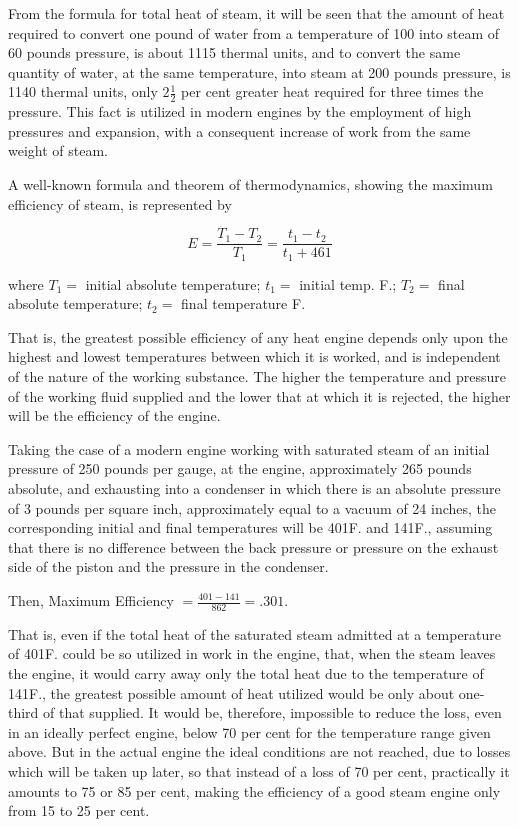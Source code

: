 \documentclass[11pt, a5paper]{book}
\begin{document}
From the formula for total heat of steam, it will be seen that the
amount of heat required to convert one pound of water from a
temperature of 100\degree{} into steam of 60 pounds pressure, is about
1115 thermal units, and to convert the same quantity of water, at the
same temperature, into steam at 200 pounds pressure, is 1140 thermal
units, only $2\frac{1}{2}$ per cent greater heat required for three
times the pressure.  This fact is utilized in modern engines by the
employment of high pressures and expansion, with a consequent increase
of work from the same weight of steam.\par

A well-known formula and theorem of thermodynamics, showing the
maximum efficiency of steam, is represented by\par

\begin{equation*}
  E = \frac{T_1 - T_2}{T_1} = \frac{t_1 - t_2}{t_1 + 461}
\end{equation*}

\noindent{} where $T_1 =$ initial absolute temperature; $t_1 =$
initial temp. F.; $T_2 =$ final absolute temperature; $t_2 =$ final
temperature F.\par

That is, the greatest possible efficiency of any heat engine depends
only upon the highest and lowest temperatures between which it is
worked, and is independent of the nature of the working substance.
The higher the temperature and pressure of the working fluid supplied
and the lower that at which it is rejected, the higher will be the
efficiency of the engine.\par

Taking the case of a modern engine working with saturated steam of an
initial pressure of 250 pounds per gauge, at the engine, approximately
265 pounds absolute, and exhausting into a condenser in which there is
an absolute pressure of 3 pounds per square inch, approximately equal
to a vacuum of 24 inches, the corresponding initial and final
temperatures will be 401\degree{}F. and 141\degree{}F., assuming that
there is no difference between the back pressure or pressure on the
exhaust side of the piston and the pressure in the condenser.\par

Then, Maximum Efficiency $=\frac{401 - 141}{862} = .301$.\par

That is, even if the total heat of the saturated steam admitted at a
temperature of 401\degree{}F. could be so utilized in work in the
engine, that, when the steam leaves the engine, it would carry away
only the total heat due to the temperature of 141\degree{}F., the
greatest possible amount of heat utilized would be only about
one-third of that supplied.  It would be, therefore, impossible to
reduce the loss, even in an ideally perfect engine, below 70 per cent
for the temperature range given above.  But in the actual engine the
ideal conditions are not reached, due to losses which will be taken up
later, so that instead of a loss of 70 per cent, practically it
amounts to 75 or 85 per cent, making the efficiency of a good steam
engine only from 15 to 25 per cent.\par
\end{document}
